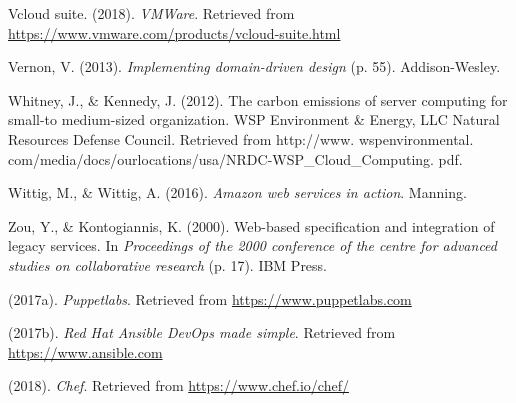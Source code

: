 \documentclass[12pt,twoside]{reedthesis}
\theoremstyle{definition}
\theoremstyle{definition}
\theoremstyle{definition}
\theoremstyle{remark}
\begin{document}
\leavevmode\hypertarget{ref-Cap3_6_mT}{}%
Vcloud suite. (2018). \emph{VMWare}. Retrieved from
\url{https://www.vmware.com/products/vcloud-suite.html}

\leavevmode\hypertarget{ref-Cap4_ImplementingPlantillaDibujo}{}%
Vernon, V. (2013). \emph{Implementing domain-driven design} (p. 55).
Addison-Wesley.

\leavevmode\hypertarget{ref-Cap1_1_PdP}{}%
Whitney, J., \& Kennedy, J. (2012). The carbon emissions of server
computing for small-to medium-sized organization. WSP Environment \&
Energy, LLC Natural Resources Defense Council. Retrieved from
http://www. wspenvironmental.
com/media/docs/ourlocations/usa/NRDC-WSP\_Cloud\_Computing. pdf.

\leavevmode\hypertarget{ref-Cap3_7mT}{}%
Wittig, M., \& Wittig, A. (2016). \emph{Amazon web services in action}.
Manning.

\leavevmode\hypertarget{ref-Cap1_WebBased}{}%
Zou, Y., \& Kontogiannis, K. (2000). Web-based specification and
integration of legacy services. In \emph{Proceedings of the 2000
conference of the centre for advanced studies on collaborative research}
(p. 17). IBM Press.

\leavevmode\hypertarget{ref-Cap3_Puppet}{}%
(2017a). \emph{Puppetlabs}. Retrieved from
\url{https://www.puppetlabs.com}

\leavevmode\hypertarget{ref-Cap3_ansible}{}%
(2017b). \emph{Red Hat Ansible DevOps made simple}. Retrieved from
\url{https://www.ansible.com}

\leavevmode\hypertarget{ref-Cap3_9mT}{}%
(2018). \emph{Chef}. Retrieved from \url{https://www.chef.io/chef/}


\end{document}
